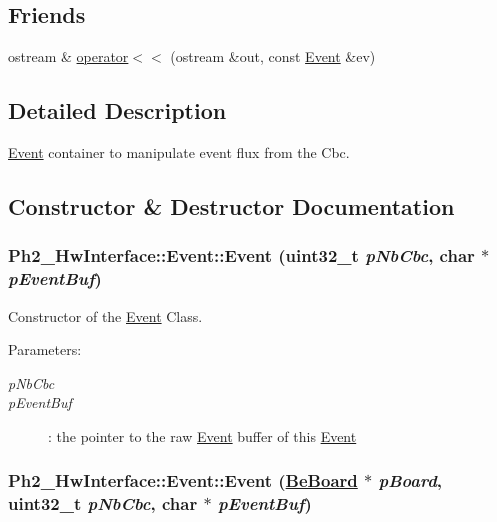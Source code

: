 \subsection*{Friends}
\begin{CompactItemize}
\item 
ostream \& \hyperlink{class_ph2___hw_interface_1_1_event_dd2a25ce09465ee24314bbbf409f7ee1}{operator$<$$<$} (ostream \&out, const \hyperlink{class_ph2___hw_interface_1_1_event}{Event} \&ev)
\end{CompactItemize}


\subsection{Detailed Description}
\hyperlink{class_ph2___hw_interface_1_1_event}{Event} container to manipulate event flux from the Cbc. 



\subsection{Constructor \& Destructor Documentation}
\hypertarget{class_ph2___hw_interface_1_1_event_683bd51c34b6b849a970f50b4c2a61c3}{
\subsubsection[Event]{\setlength{\rightskip}{0pt plus 5cm}Ph2\_\-Hw\-Interface::Event::Event (uint32\_\-t {\em p\-Nb\-Cbc}, char $\ast$ {\em p\-Event\-Buf})}}
\label{class_ph2___hw_interface_1_1_event_683bd51c34b6b849a970f50b4c2a61c3}


Constructor of the \hyperlink{class_ph2___hw_interface_1_1_event}{Event} Class. 

\begin{Desc}
\item[Parameters:]
\begin{description}
\item[{\em p\-Nb\-Cbc}]\item[{\em p\-Event\-Buf}]: the pointer to the raw \hyperlink{class_ph2___hw_interface_1_1_event}{Event} buffer of this \hyperlink{class_ph2___hw_interface_1_1_event}{Event} \end{description}
\end{Desc}
\hypertarget{class_ph2___hw_interface_1_1_event_39280981aa5ea8a3a6d9adce5e1fe409}{
\subsubsection[Event]{\setlength{\rightskip}{0pt plus 5cm}Ph2\_\-Hw\-Interface::Event::Event (\hyperlink{class_ph2___hw_description_1_1_be_board}{Be\-Board} $\ast$ {\em p\-Board}, uint32\_\-t {\em p\-Nb\-Cbc}, char $\ast$ {\em p\-Event\-Buf})}}
\label{class_ph2___hw_interface_1_1_event_39280981aa5ea8a3a6d9adce5e1fe409}


